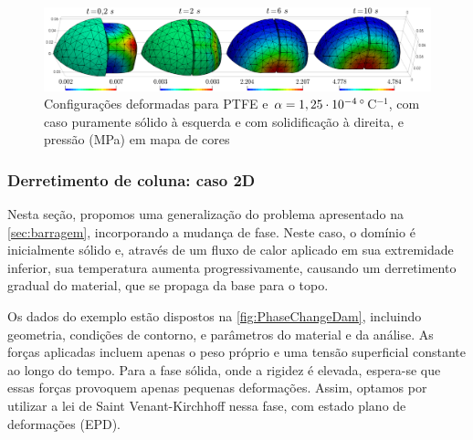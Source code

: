 \documentclass[Tese.tex]{subfiles}
\begin{document}
\begin{figure}[!htb]
	\centering
	\caption{Configurações deformadas para PTFE e $\alpha = 1,25\cdot 10^{-4}\,^{\circ}$C$^{-1}$, com caso puramente sólido à esquerda e com solidificação à direita, e pressão (MPa) em mapa de cores}
	\label{fig:PhaseChangeConsistencyTest3D-PTFE-a125e-4}
	\includegraphics[width=\textwidth]{Figuras/PhaseChangeConsistencyTest3D/PTFE-a125e-4.png}
\end{figure}



\subsubsection{Derretimento de coluna: caso 2D}

Nesta seção, propomos uma generalização do problema apresentado na \cref{sec:barragem}, incorporando a mudança de fase. Neste caso, o domínio é inicialmente sólido e, através de um fluxo de calor aplicado em sua extremidade inferior, sua temperatura aumenta progressivamente, causando um derretimento gradual do material, que se propaga da base para o topo. 

Os dados do exemplo estão dispostos na \cref{fig:PhaseChangeDam}, incluindo geometria, condições de contorno, e parâmetros do material e da análise. As forças aplicadas incluem apenas o peso próprio e uma tensão superficial constante ao longo do tempo. Para a fase sólida, onde a rigidez é elevada, espera-se que essas forças provoquem apenas pequenas deformações. Assim, optamos por utilizar a lei de Saint Venant-Kirchhoff nessa fase, com estado plano de deformações (EPD).
\end{document}
